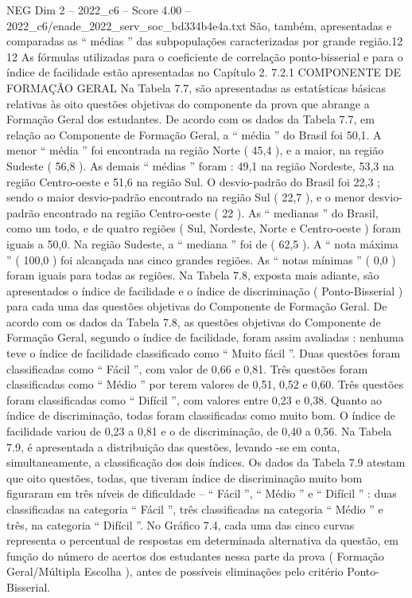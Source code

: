 \begin{textsample}{NEG Dim 2 – 2022\_c6 – Score 4.00 – 2022\_c6/enade\_2022\_serv\_soc\_bd334b4e4a.txt}
São, também, apresentadas e comparadas as “ médias ” das subpopulações caracterizadas por grande região.12 12 As fórmulas utilizadas para o coeficiente de correlação ponto-bisserial e para o índice de facilidade estão apresentadas no Capítulo 2. 7.2.1 COMPONENTE DE FORMAÇÃO GERAL Na Tabela 7.7, são apresentadas as estatísticas básicas relativas às oito questões objetivas do componente da prova que abrange a Formação Geral dos estudantes.
De acordo com os dados da Tabela 7.7, em relação ao Componente de Formação Geral, a “ média ” do Brasil foi 50,1.
A menor “ média ” foi encontrada na região Norte ( 45,4 ), e a maior, na região Sudeste ( 56,8 ).
As demais “ médias ” foram : 49,1 na região Nordeste, 53,3 na região Centro-oeste e 51,6 na região Sul.
O desvio-padrão do Brasil foi 22,3 ; sendo o maior desvio-padrão encontrado na região Sul ( 22,7 ), e o menor desvio-padrão encontrado na região Centro-oeste ( 22 ).
As “ medianas ” do Brasil, como um todo, e de quatro regiões ( Sul, Nordeste, Norte e Centro-oeste ) foram iguais a 50,0.
Na região Sudeste, a “ mediana ” foi de ( 62,5 ).
A “ nota máxima ” ( 100,0 ) foi alcançada nas cinco grandes regiões.
As “ notas mínimas ” ( 0,0 ) foram iguais para todas as regiões.
Na Tabela 7.8, exposta mais adiante, são apresentados o índice de facilidade e o índice de discriminação ( Ponto-Bisserial ) para cada uma das questões objetivas do Componente de Formação Geral.
De acordo com os dados da Tabela 7.8, as questões objetivas do Componente de Formação Geral, segundo o índice de facilidade, foram assim avaliadas : nenhuma teve o índice de facilidade classificado como “ Muito fácil ”.
Duas questões foram classificadas como “ Fácil ”, com valor de 0,66 e 0,81.
Três questões foram classificadas como “ Médio ” por terem valores de 0,51, 0,52 e 0,60.
Três questões foram classificadas como “ Difícil ”, com valores entre 0,23 e 0,38.
Quanto ao índice de discriminação, todas foram classificadas como muito bom.
O índice de facilidade variou de 0,23 a 0,81 e o de discriminação, de 0,40 a 0,56.
Na Tabela 7.9, é apresentada a distribuição das questões, levando -se em conta, simultaneamente, a classificação dos dois índices.
Os dados da Tabela 7.9 atestam que oito questões, todas, que tiveram índice de discriminação muito bom figuraram em três níveis de dificuldade – “ Fácil ”, “ Médio ” e “ Difícil ” : duas classificadas na categoria “ Fácil ”, três classificadas na categoria “ Médio ” e três, na categoria “ Difícil ”.
No Gráfico 7.4, cada uma das cinco curvas representa o percentual de respostas em determinada alternativa da questão, em função do número de acertos dos estudantes nessa parte da prova ( Formação Geral/Múltipla Escolha ), antes de possíveis eliminações pelo critério Ponto-Bisserial.

\end{textsample}
